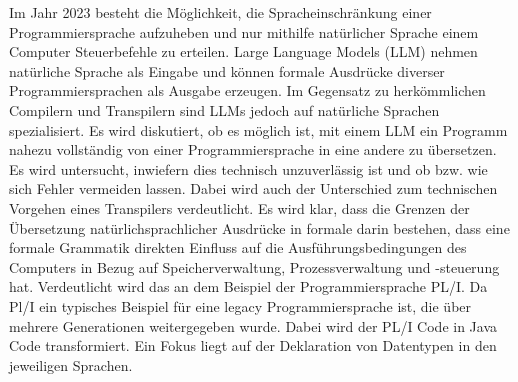 Im Jahr 2023 besteht die Möglichkeit, die Spracheinschränkung einer Programmiersprache
aufzuheben und nur mithilfe natürlicher Sprache einem Computer
Steuerbefehle zu erteilen. Large Language Models (LLM) nehmen natürliche
Sprache als Eingabe und können formale Ausdrücke diverser Programmiersprachen
als Ausgabe erzeugen. Im Gegensatz zu herkömmlichen Compilern
und Transpilern sind LLMs jedoch auf natürliche Sprachen spezialisiert. Es wird
diskutiert, ob es möglich ist, mit einem LLM ein Programm nahezu vollständig
von einer Programmiersprache in eine andere zu übersetzen. Es wird untersucht,
inwiefern dies technisch unzuverlässig ist und ob bzw. wie sich Fehler
vermeiden lassen. Dabei wird auch der Unterschied zum technischen Vorgehen
eines Transpilers verdeutlicht. Es wird klar, dass die Grenzen der Übersetzung
natürlichsprachlicher Ausdrücke in formale darin bestehen, dass eine formale
Grammatik direkten Einfluss auf die Ausführungsbedingungen des Computers
in Bezug auf Speicherverwaltung, Prozessverwaltung und -steuerung hat.
Verdeutlicht wird das an dem Beispiel der Programmiersprache PL/I. Da
Pl/I ein typisches Beispiel für eine legacy Programmiersprache ist, die über
mehrere Generationen weitergegeben wurde. Dabei wird der PL/I Code in
Java Code transformiert. Ein Fokus liegt auf der Deklaration von Datentypen
in den jeweiligen Sprachen.